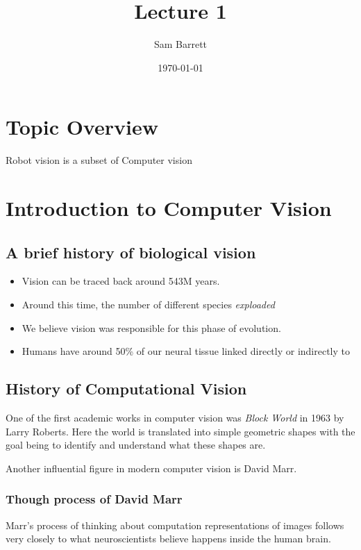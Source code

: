 \documentclass{article}
\author{Sam Barrett}
\date{\today}
\title{Lecture 1}
\begin{document}
\maketitle

\section{Topic Overview}
\label{sec:org67939df}

Robot vision is a subset of Computer vision

\section{Introduction to Computer Vision}
\label{sec:orgdd022ac}

\subsection{A brief history of biological vision}
\label{sec:org9d27a8e}

\begin{itemize}
\item Vision can be traced back around 543M years.
\item Around this time, the number of different species \emph{exploaded}
\item We believe vision was responsible for this phase of evolution.
\item Humans have around 50\% of our neural tissue linked directly or indirectly to
\end{itemize}

\subsection{History of Computational Vision}
\label{sec:orgab35275}
One of the first academic works in computer vision was \emph{Block World} in 1963 by Larry Roberts. Here the world is translated into simple geometric shapes with the goal being to identify and understand what these shapes are.

Another influential figure in modern computer vision is David Marr.
\subsubsection{Though process of David Marr}
\label{sec:org4a1ae90}

Marr's process of thinking about computation representations of images follows very closely to what neuroscientists believe happens inside the human brain.
\end{document}
